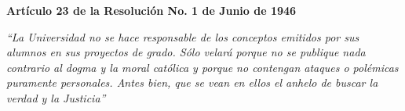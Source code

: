 \thispagestyle{fancy}

{\large\bfseries Artículo 23 de la Resolución No. 1 de Junio de 1946}

\vspace{1cm}

\textit{``La Universidad no se hace responsable de los conceptos emitidos por sus alumnos en sus proyectos de grado. Sólo velará porque no se publique nada contrario al dogma y la moral católica y porque no contengan ataques o polémicas puramente personales. Antes bien, que se vean en ellos el anhelo de buscar la verdad y la Justicia''}

